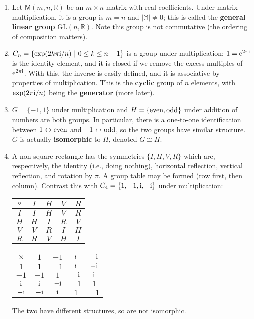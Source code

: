 \documentclass[letter-paper]{tufte-book}
\newenvironment{example}[1][Example]{\begin{trivlist}
\item[\hskip \labelsep {\bfseries #1}]}{\end{trivlist}}
\newcommand{\ex}{\mathrm{e}}
\newcommand{\zi}{{\rm i}}
\newcommand\Def[1]{\textbf{#1}}
\begin{document}
\begin{example}

\begin{enumerate}
	\item Let $\mathsf{M}(m,n,\mathbb{R})$ be an $m\times n$ matrix with real
	coefficients. Under matrix multiplication, it is a group is $m=n$ and
	$|\mathbb{M}|\neq0$; this is called the \Def{general linear group}
	$\mbox{GL}(n,\mathbb{R})$. Note this group is not commutative (the ordering of
	composition matters).
	
	\item $C_n=\{\exp(2k\pi\zi/n)\ |\ 0\leq k\leq n-1\}$ is a group under
	multiplication: $1=\ex^{2\pi \zi}$ is the identity element, and it is closed
	if we remove the excess multiples of $\ex^{2\pi \zi}$. With this, the inverse
	is easily defined, and it is associative by properties of multiplication. This
	is the \Def{cyclic} group of $n$ elements, with $\exp(2\pi\zi/n)$ being
	the \Def{generator} (more later).
	
	\item $G=\{-1,1\}$ under multiplication and
	$H=\{\textnormal{even},\textnormal{odd}\}$ under addition of numbers are both
	groups. In particular, there is a one-to-one identification between
	$1\leftrightarrow\textnormal{even}$ and $-1\leftrightarrow\textnormal{odd}$,
	so the two groups have similar structure. $G$ is actually
	\Def{isomorphic} to $H$, denoted $G\cong H$.
	
	\item A non-square rectangle has the symmetries $\{I,H,V,R\}$ which are,
	respectively, the identity (i.e., doing nothing), horizontal reflection,
	vertical reflection, and rotation by $\pi$. A group table may be formed (row
	first, then column). Contrast this with $C_4=\{1,-1,\zi,-\zi\}$ under
	multiplication:
	\begin{table}[h]
	\begin{center}\begin{tabular}{c|cccc}
		$\circ$ & $I$ & $H$ & $V$ & $R$\\
		\hline
		$I$ & $I$ & $H$ & $V$ & $R$\\
		$H$ & $H$ & $I$ & $R$ & $V$\\
		$V$ & $V$ & $R$ & $I$ & $H$\\
		$R$ & $R$ & $V$ & $H$ & $I$
	\end{tabular}\qquad\qquad\begin{tabular}{c|cccc}
		$\times$ & $1$ & $-1$ & $\zi$ & $-\zi$\\
		\hline
		$1$ & $1$ & $-1$ & $\zi$ & $-\zi$\\
		$-1$ & $-1$ & $1$ & $-\zi$ & $\zi$\\
		$\zi$ & $\zi$ & $-\zi$ & $-1$ & $1$\\
		$-\zi$ & $-\zi$ & $\zi$ & $1$ & $-1$
	\end{tabular}\end{center}
	\end{table}
	The two have different structures, so are not isomorphic.
\end{enumerate}
\end{example}
\end{document}
